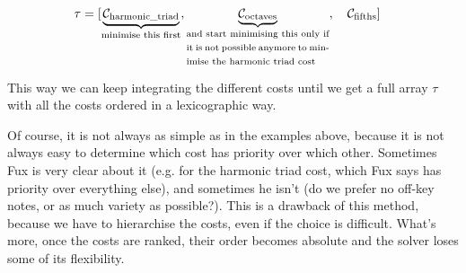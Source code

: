     \begin{equation}
        \begin{aligned}
            \tau = [& \underset{\text{\fontsize{7}{11}\selectfont{minimise this first}}}{\underbrace{\mathcal{C}_\text{harmonic\_triad}}}, \underset{\text{\fontsize{7}{11}\selectfont\parbox{4cm}{and start minimising this only if it is not possible anymore to minimise the harmonic triad cost}}}{\underbrace{\mathcal{C}_\text{octaves}}},\quad  \mathcal{C}_\text{fifths}]
        \end{aligned}
    \end{equation}

This way we can keep integrating the different costs until we get a full array $\tau$ with all the costs ordered in a lexicographic way.


Of course, it is not always as simple as in the examples above, because it is not always easy to determine which cost has priority over which other. Sometimes Fux is very clear about it (e.g. for the harmonic triad cost, which Fux says has priority over everything else), and sometimes he isn't (do we prefer no off-key notes, or as much variety as possible?). This is a drawback of this method, because we have to hierarchise the costs, even if the choice is difficult. What's more, once the costs are ranked, their order becomes absolute and the solver loses some of its flexibility.


